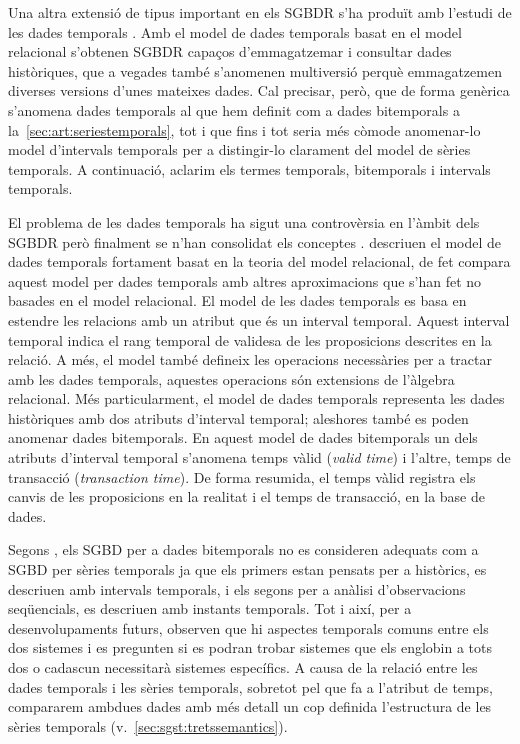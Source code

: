 Una altra extensió de tipus important en els \gls{SGBDR} s'ha produït
amb l'estudi de les dades
temporals \parencite{date02:_tempor_data_relat_model}.  Amb el model
de dades temporals basat en el model relacional s'obtenen \gls{SGBDR}
capaços d'emmagatzemar i consultar dades històriques, que a vegades
també s'anomenen multiversió perquè emmagatzemen diverses versions
d'unes mateixes dades. Cal precisar, però, que de forma genèrica
s'anomena dades temporals al que hem definit com a dades bitemporals a
la~\autoref{sec:art:seriestemporals}, tot i que fins i tot seria més
còmode anomenar-lo model d'intervals temporals per a distingir-lo
clarament del model de sèries temporals. A continuació, aclarim els
termes temporals, bitemporals i intervals temporals.


El problema de les dades temporals ha sigut una controvèrsia en
l'àmbit dels \gls{SGBDR} però finalment se n'han consolidat els
conceptes
\parencite{jensen99:temporaldata,jensen98:temporal_database_glossary,tansel93:temporal_databases}. %
\textcite{date02:_tempor_data_relat_model} descriuen el model de dades
temporals fortament basat en la teoria del model relacional, de fet
\textcite[cap.~28]{date06} compara aquest model per dades temporals
amb altres aproximacions que s'han fet no basades en el model
relacional.  El model de les dades
temporals \parencite{date02:_tempor_data_relat_model} es basa en
estendre les relacions amb un atribut que és un interval
temporal. Aquest interval temporal indica el rang temporal de validesa
de les proposicions descrites en la relació. A més, el model també
defineix les operacions necessàries per a tractar amb les dades
temporals, aquestes operacions són extensions de l'àlgebra relacional.
Més particularment, el model de dades temporals representa
les dades històriques amb dos atributs d'interval temporal; aleshores
també es poden anomenar dades bitemporals. En aquest model de dades
bitemporals
\parencite[cap.~15]{date02:_tempor_data_relat_model,jensen99:temporaldata} %
un dels atributs d'interval temporal s'anomena temps vàlid
(\emph{valid time}) i l'altre, temps de transacció (\emph{transaction
  time}). De forma resumida, el temps vàlid registra els canvis de les
proposicions en la realitat i el temps de transacció, en la base de
dades.




Segons \textcite{schmidt95}, els \gls{SGBD} per a dades bitemporals no
es consideren adequats com a \gls{SGBD} per sèries temporals ja que
els primers estan pensats per a històrics, es descriuen amb intervals
temporals, i els segons per a anàlisi d'observacions seqüencials, es
descriuen amb instants temporals. Tot i així, per a desenvolupaments
futurs, observen que hi aspectes temporals comuns entre els dos
sistemes i es pregunten si es podran trobar sistemes que els englobin
a tots dos o cadascun necessitarà sistemes específics.  A causa de la
relació entre les dades temporals i les sèries temporals, sobretot pel
que fa a l'atribut de temps, compararem ambdues dades amb més detall
un cop definida l'estructura de les sèries temporals
(v.~\autoref{sec:sgst:tretssemantics}).


